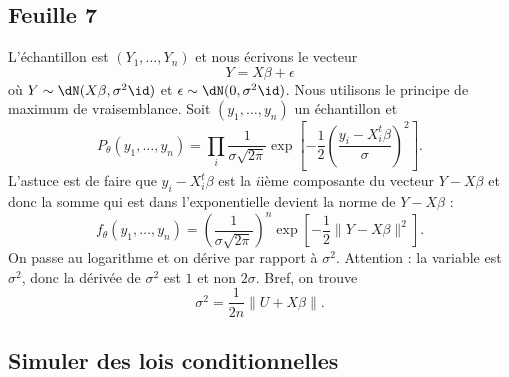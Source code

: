 \subsection{Feuille 7}

L'échantillon est \( (Y_1,\ldots, Y_n) \) et nous écrivons le vecteur
\begin{equation}
    Y=X\beta+\epsilon
\end{equation}
où \( Y\sim\dN(X\beta,\sigma^2\id)\) et \( \epsilon\sim\dN(0,\sigma^2\id)\). Nous utilisons le principe de maximum de vraisemblance. Soit \( (y_1,\ldots, y_n)\) un échantillon et
\begin{equation}
    P_{\theta}(y_1,\ldots, y_n)=\prod_i\frac{1}{ \sigma\sqrt{2\pi }}\exp\left[ -\frac{ 1 }{2}\left( \frac{ y_i-X_i^t\beta }{ \sigma } \right)^2 \right].
\end{equation}
L'astuce est de faire que \( y_i-X_i^t\beta\) est la \( i\)ième composante du vecteur \( Y-X\beta\) et donc la somme qui est dans l'exponentielle devient la norme de \( Y-X\beta\) :
\begin{equation}
    f_{\theta}(y_1,\ldots, y_n)=\left( \frac{1}{ \sigma\sqrt{2\pi} } \right)^n\exp\left[ -\frac{ 1 }{2}\| Y-X\beta \|^2 \right].
\end{equation}
On passe au logarithme et on dérive par rapport à \( \sigma^2\). Attention : la variable est \( \sigma^2\), donc la dérivée de \( \sigma^2\) est \( 1\) et non \( 2\sigma\). Bref, on trouve
\begin{equation}
    \sigma^2=\frac{1}{ 2n }\| U+X\beta \|.
\end{equation}

\subsection{Simuler des lois conditionnelles}

